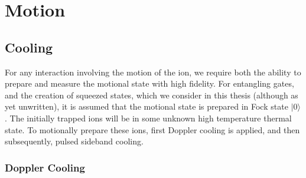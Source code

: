 \section{Motion}
\label{sec:Motion}

\subsection{Cooling}
\label{sec:Cooling}

    For any interaction involving the motion of the ion, we require both the
    ability to prepare and measure the motional state with high fidelity. For
    entangling gates, and the creation of squeezed states, which we 
    consider in this thesis (although as yet unwritten), it is assumed that the motional state is prepared in Fock state $|0\rangle$. The initially trapped ions will
    be in some unknown high temperature thermal state. To motionally prepare these ions, first Doppler cooling is applied, and then
    subsequently, pulsed sideband cooling. \\

\subsubsection{Doppler Cooling}

